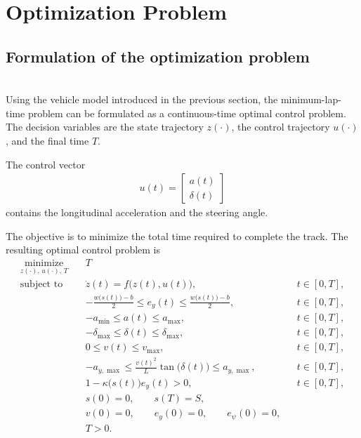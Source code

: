 \section{Optimization Problem}
\subsection{Formulation of the optimization problem}\;\\
Using the vehicle model introduced in the previous section, the minimum-lap-time problem can be formulated as a continuous-time optimal control problem. The decision variables are the state trajectory $z(\cdot)$, the control trajectory $u(\cdot)$, and the final time $T$.

The control vector
\begin{align*}
    u(t) = \begin{bmatrix} a(t) \\ \delta(t) \end{bmatrix}
\end{align*}
contains the longitudinal acceleration and the steering angle.

The objective is to minimize the total time required to complete the track. 
The resulting optimal control problem is
\begin{align}
    \underset{z(\cdot),\,u(\cdot),\,T}{\operatorname{minimize}}
    \quad & T
    \label{eq:objective}
    \\[0.5em]
    \text{subject to}
    \quad
    & \dot{z}(t)
    =
    f\bigl(z(t),u(t)\bigr),
    && t\in[0,T],
    \label{eq:dynamics}
    \\[0.3em]
    & -\frac{w\bigl(s(t)\bigr)-b}{2}
    \leq e_y(t)
    \leq
    \frac{w\bigl(s(t)\bigr)-b}{2},
    && t\in[0,T],
    \label{eq:track_constraint}
    \\[0.3em]
    & -a_{\min}
    \leq a(t)
    \leq a_{\max},
    && t\in[0,T],
    \label{eq:acceleration_constraint}
    \\[0.3em]
    & -\delta_{\max}
    \leq \delta(t)
    \leq \delta_{\max},
    && t\in[0,T],
    \label{eq:steering_constraint}
    \\[0.3em]
    & 0
    \leq v(t)
    \leq v_{\max},
    && t\in[0,T],
    \label{eq:velocity_constraint}
    \\[0.3em]
    & -a_{y,\max}
    \leq
    \frac{v(t)^2}{L}\tan\bigl(\delta(t)\bigr)
    \leq
    a_{y,\max},
    && t\in[0,T],
    \label{eq:lateral_acceleration_constraint}
    \\[0.3em]
    & 1-\kappa\bigl(s(t)\bigr)e_y(t)>0,
    && t\in[0,T],
    \label{eq:frenet_validity_constraint}
    \\[0.3em]
    & s(0)=0,
    \qquad
    s(T)=S,
    \label{eq:position_boundary_conditions}
    \\[0.3em]
    & v(0)=0,
    \qquad
    e_y(0)=0,
    \qquad
    e_\psi(0)=0,
    \label{eq:initial_conditions}
    \\[0.3em]
    & T>0.
    \label{eq:time_constraint}
\end{align}


